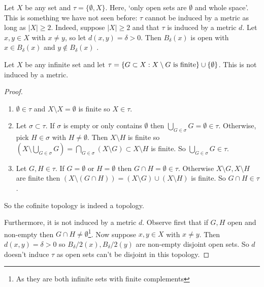 \begin{example}
    Let $X$ be any set and $\tau = \{\emptyset, X\}$. Here, `only open sets are $\emptyset$ and whole space'.
    This is something we have not seen before: $\tau$ cannot be induced by a metric as long as $|X| \geq 2$.
    Indeed, suppose $|X|  \geq 2$ and that $\tau$ is induced by a metric $d$.
    Let $x,y \in X$ with $x\neq y$, so let $d(x,y) = \delta>0$.
    Then $B_\delta(x)$ is open with $x \in B_\delta(x)$ and $y \not\in B_\delta(x)$ \Lightning.
\end{example}

\begin{example}
    Let $X$ be any infinite set and let $\tau = \{G\subset X : X \setminus G \textup{ is finite} \} \cup \{\emptyset\}$.
    This is not induced by a metric.

    \begin{proof}
        \begin{enumerate}
            \item $\emptyset\in\tau$ and $X \setminus X = \emptyset$ is finite so $X\in\tau$.
            \item Let $\sigma \subset\tau$. If $\sigma$ is empty or only contains $\emptyset$ then $\bigcup_{G\in \sigma} G = \emptyset\in \tau$.
            Otherwise, pick $H\in \sigma$ with $H\neq \emptyset$. Then $X \setminus H$ is finite so $(X \setminus\bigcup_{G\in \sigma} G) = \bigcap_{G\in \sigma} (X \setminus G)\subset X \setminus H$ is finite. So $\bigcup_{G\in \sigma} G \in \tau.$
            \item Let $G,H\in \tau$. If $G = \emptyset$ or $H=\emptyset$ then $G\cap H = \emptyset\in\tau$. Otherwise $X \setminus G, X \setminus H$ are finite then $(X \setminus(G\cap H)) = (X \setminus G)\cup(X \setminus H)$ is finite. So $G\cap H\in \tau$.
        \end{enumerate}

        So the cofinite topology is indeed a topology.

        Furthermore, it is not induced by a metric $d$.
        Observe first that if $G,H$ open and non-empty then $G\cap H\neq \emptyset$\footnote{As they are both infinite sets with finite complements}.
        Now suppose $x, y \in X$ with $x \neq y$.
        Then $d(x,y) = \delta > 0$ so $B_\delta/2(x), B_\delta/2(y)$ are non-empty disjoint open sets. So $d$ doesn't induce $\tau$ as open sets can't be disjoint in this topology.
        \end{proof}
\end{example}

